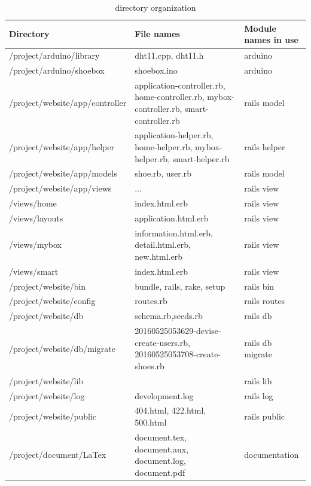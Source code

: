 \documentclass[conference]{IEEEtran}
\begin{document}
\begin{table}[h]
\renewcommand{\arrayrulewidth}{1pt}
\renewcommand{\arraystretch}{2}
\begin{tabular}
{|m{3.3cm}|m{2.5cm}|m{2.5cm}|}\hline

Directory & File names & Module names in use\\ \hline
/project/arduino/library & dht11.cpp, dht11.h & arduino\\ \hline
/project/arduino/shoebox & shoebox.ino & arduino\\ \hline
/project/website/app/controller & application-controller.rb, home-controller.rb, mybox-controller.rb, smart-controller.rb & rails model\\ \hline
/project/website/app/helper & application-helper.rb, home-helper.rb, mybox-helper.rb, smart-helper.rb & rails helper\\ \hline
/project/website/app/models & shoe.rb, user.rb & rails model\\ \hline
/project/website/app/views & ... & rails view\\ \hline
/views/home & index.html.erb & rails view\\ \hline
/views/layouts & application.html.erb & rails view\\ \hline
/views/mybox & information.html.erb, detail.html.erb, new.html.erb & rails view\\ \hline
/views/smart & index.html.erb & rails view\\ \hline
/project/website/bin & bundle, rails, rake, setup & rails bin\\ \hline
/project/website/config & routes.rb & rails routes\\ \hline
/project/website/db & schema.rb,seeds.rb & rails db\\ \hline
/project/website/db/migrate & 20160525053629-devise-create-users.rb, 20160525053708-create-shoes.rb & rails db migrate\\ \hline
/project/website/lib & & rails lib\\ \hline
/project/website/log & development.log & rails log\\ \hline
/project/website/public & 404.html, 422.html, 500.html & rails public\\ \hline
/project/document/LaTex & document.tex, document.aux, document.log, document.pdf & documentation\\ \hline


\end{tabular}
\\
\\
\caption{directory organization}
\label{tab:template}
\end{table}
\end{document}
